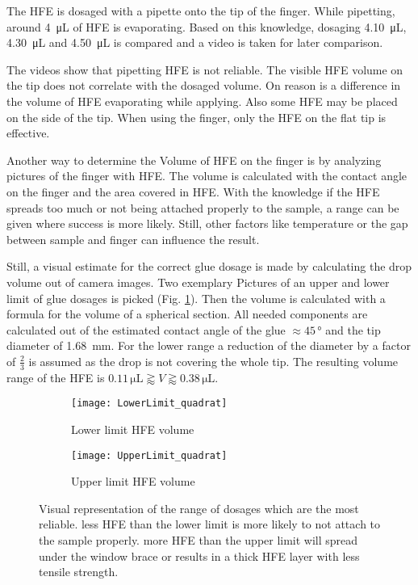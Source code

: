 
The HFE is dosaged with a pipette onto the tip of the finger. While pipetting, around \SI{4}{\micro\liter} of HFE is evaporating. Based on this knowledge, dosaging \SI{4.10}{\micro\liter}, \SI{4.30}{\micro\liter} and \SI{4.50}{\micro\liter} is compared and a video is taken for later comparison.

The videos show that pipetting HFE is not reliable. The visible HFE volume on the tip does not correlate with the dosaged volume. On reason is a difference in the volume of HFE evaporating while applying. Also some HFE may be placed on the side of the tip. When using the finger, only the HFE on the flat tip is effective.

Another way to determine the Volume of HFE on the finger is by analyzing pictures of the finger with HFE. The volume is calculated with the contact angle on the finger and the area covered in HFE. With the knowledge if the HFE spreads too much or not being attached properly to the sample, a range can be given where success is more likely. Still, other factors like temperature or the gap between sample and finger can influence the result.

Still, a visual estimate for the correct glue dosage is made by calculating the drop volume out of camera images. Two exemplary Pictures of an upper and lower limit of glue dosages is picked (Fig. \ref{fig:rangeHFE}). Then the volume is calculated with a formula for the volume of a spherical section. All needed components are calculated out of the estimated contact angle of the glue $\approx 45\,\si{\degree}$ and the tip diameter of \SI{1.68}{\milli\meter}. For the lower range a reduction of the diameter by a factor of $\frac{2}{3}$ is assumed as the drop is not covering the whole tip. The resulting volume range of the HFE is $ 0.11\,\si{\micro\liter} \gtrapprox V \gtrapprox 0.38\,\si{\micro\liter}$.

\begin{figure}[hbt!]
	\centering
	\begin{subfigure}[]{0.45\textwidth}
		\centering
		\texttt{[image: LowerLimit\_quadrat]}
		\caption{Lower limit HFE volume}
	\end{subfigure}
	\begin{subfigure}[]{0.45\textwidth}
		\centering
		\texttt{[image: UpperLimit\_quadrat]}
		\caption{Upper limit HFE volume}
	\end{subfigure}
	\caption{Visual representation of the range of dosages which are the most reliable. less HFE than the lower limit is more likely to not attach to the sample properly. more HFE than the upper limit will spread under the window brace or results in a thick HFE layer with less tensile strength.}
	\label{fig:rangeHFE}
\end{figure}

